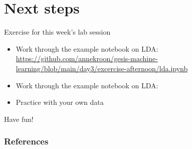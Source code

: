 \documentclass[compress]{beamer}
\begin{document}
\section{Next steps}

\begin{frame}[plain]
	
	\begin{block}{Exercise for this week's lab session}
		\footnotesize
		\begin{itemize}
			\item Work through the example notebook on LDA: \url{https://github.com/annekroon/gesis-machine-learning/blob/main/day3/excercise-afternoon/lda.ipynb}
			\item Work through the example notebook on LDA:
			\item Practice with your own data
		\end{itemize}
	\end{block}
	
\end{frame}

\begin{frame}[standout]
Have fun!
\end{frame}

\begin{frame}[t,allowframebreaks]
	\frametitle{References}
	\printbibliography
\end{frame}
\end{document}
